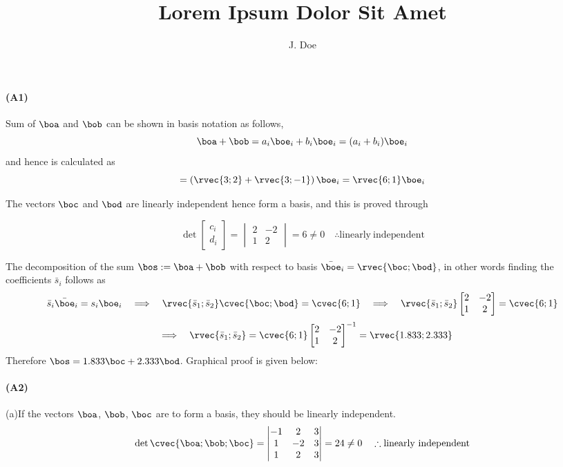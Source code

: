 \documentclass[a4paper,twosided,11pt,DIV15]{scrartcl}
\title{Lorem Ipsum Dolor Sit Amet}
\author{J. Doe}
\begin{document}
\maketitle






\paragraph{(A1)}
Sum of $\boa$ and $\bob$ can be shown in basis notation as follows,
$$ \boa+\bob=a_i\boe_i + b_i\boe_i = (a_i+b_i)\boe_i$$
and hence is calculated as
$$ = \left(\rvec{3;2}+\rvec{3;-1}\right)\boe_i=\rvec{6;1}\boe_i$$

The vectors $\boc$ and $\bod$ are linearly independent hence form a
basis, and this is proved through

$$\det\begin{bmatrix}c_i\\d_i\end{bmatrix} = 
\begin{vmatrix}2 & -2\\1&2\end{vmatrix} = 6 \neq 0\quad \therefore
\mathrm{linearly\ independent}$$

The decomposition of the sum $\bos:=\boa+\bob$ with respect to basis $\bar{\boe}_i=\rvec{\boc;\bod}$, in other words finding the coefficients $\bar{s}_i$ follows as
$$\bar{s}_i\bar{\boe}_i = s_i\boe_i\quad\Longrightarrow\quad 
\rvec{\bar{s}_1;\bar{s}_2}\cvec{\boc;\bod}=\cvec{6;1}\quad\Longrightarrow\quad
\rvec{\bar{s}_1;\bar{s}_2}\begin{bmatrix}2&-2\\1&2\end{bmatrix}=\cvec{6;1}
$$
$$\quad\Longrightarrow\quad
\rvec{\bar{s}_1;\bar{s}_2}=\cvec{6;1}\begin{bmatrix}2&-2\\1&2\end{bmatrix}^{-1}
= \rvec{1.833;2.333}
$$
Therefore $\bos = 1.833\boc + 2.333\bod$. Graphical proof is given
below:\\

\paragraph{(A2)} (a)\quad If the vectors $\boa$, $\bob$, $\boc$ are to form a
basis, they should be linearly independent.
$$ \det\cvec{\boa;\bob;\boc} = 
\begin{vmatrix} -1&2&3\\1&-2&3\\1&2&3\end{vmatrix} = 24 \neq 0 
\quad \therefore \mathrm{linearly\ independent}$$
\end{document}
